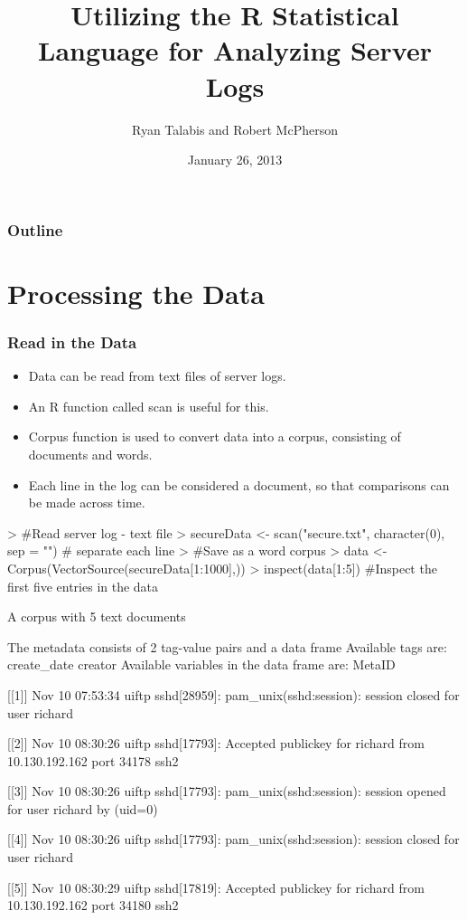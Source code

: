 \documentclass[compress,8pt]{beamer}
\title{\bfseries{Utilizing the R Statistical Language for Analyzing Server Logs}}
\author{Ryan Talabis and Robert McPherson}
\date{January 26, 2013}
\begin{document}
\begin{frame}
  \maketitle
\end{frame}

\begin{frame}
\frametitle{Outline}
\tableofcontents
\end{frame}

\section{Processing the Data}


\begin{frame}
  \frametitle{Read in the Data}
  \begin{itemize}
  \item Data can be read from text files of server logs.
  \item An R function called scan is useful for this.
  \item Corpus function is used to convert data into a corpus, consisting of documents and words.
  \item Each line in the log can be considered a document, so that comparisons can be made across time.  
  \end{itemize}
\begin{Schunk}
\begin{Sinput}
> #Read server log - text file
> secureData <- scan("secure.txt", character(0), sep = "\n") # separate each line
> #Save as a word corpus
> data <- Corpus(VectorSource(secureData[1:1000],))
> inspect(data[1:5]) #Inspect the first five entries in the data
\end{Sinput}
A corpus with 5 text documents

The metadata consists of 2 tag-value pairs and a data frame
Available tags are:
  create_date creator 
Available variables in the data frame are:
  MetaID 

[[1]]
Nov 10 07:53:34 uiftp sshd[28959]: pam_unix(sshd:session): session closed for user richard

[[2]]
Nov 10 08:30:26 uiftp sshd[17793]: Accepted publickey for richard from 10.130.192.162 port 34178 ssh2

[[3]]
Nov 10 08:30:26 uiftp sshd[17793]: pam_unix(sshd:session): session opened for user richard by (uid=0)

[[4]]
Nov 10 08:30:26 uiftp sshd[17793]: pam_unix(sshd:session): session closed for user richard

[[5]]
Nov 10 08:30:29 uiftp sshd[17819]: Accepted publickey for richard from 10.130.192.162 port 34180 ssh2\end{Schunk}
\end{frame}
\end{document}
